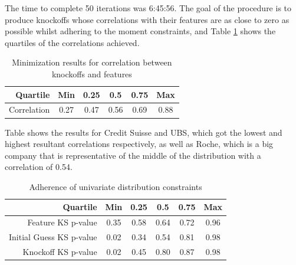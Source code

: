 \documentclass[review]{elsarticle}
\begin{document}
The time to complete 50 iterations was 6:45:56. The goal of the procedure is to produce knockoffs whose correlations with their features are as close to zero as possible whilst adhering to the moment constraints, and Table \ref{table:corrs} shows the quartiles of the correlations achieved.

\begin{table}[h!]
\centering
\begin{tabular}{r | c c c c c}
Quartile & Min & 0.25 & 0.5 & 0.75 & Max \\
\hline
Correlation & 0.27 & 0.47 & 0.56 & 0.69 & 0.88
\end{tabular}
\caption{Minimization results for correlation between knockoffs and features}
\label{table:corrs}
\end{table} 

 Table  shows the results for Credit Suisse and UBS, which got the lowest and highest resultant correlations respectively, as well as Roche, which is a big company that is representative of the middle of the distribution with a correlation of 0.54.

\begin{table}[h!]
\centering
\begin{tabular}{r | c c c c c}
Quartile & Min & 0.25 & 0.5 & 0.75 & Max \\
\hline
Feature KS p-value & 0.35 & 0.58 & 0.64 & 0.72 & 0.96 \\
Initial Guess KS p-value & 0.02 & 0.34 & 0.54 & 0.81 & 0.98 \\
Knockoff KS p-value & 0.02 & 0.45 & 0.80 & 0.87 & 0.98 \\
\end{tabular}
\caption{Adherence of univariate distribution constraints}
\label{table:ks}
\end{table} 
 
\end{document}
